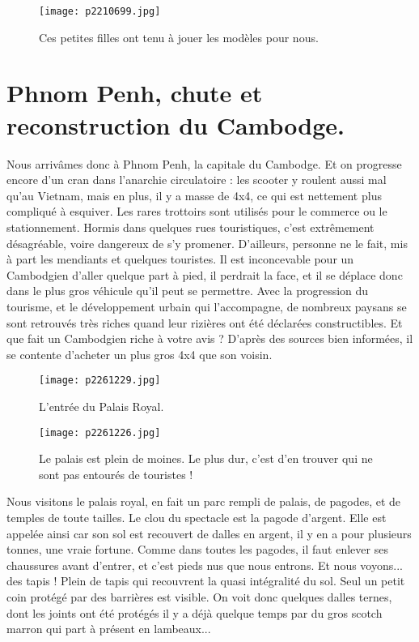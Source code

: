 \documentclass{book}
\begin{document}
\begin{figure}[h]
\centering
\texttt{[image: p2210699.jpg]}
\caption*{Ces petites filles ont tenu à jouer les modèles pour nous.}
\end{figure}



\chapter{Phnom Penh, chute et reconstruction du Cambodge.}
Nous arrivâmes donc à Phnom Penh, la capitale du Cambodge. Et on progresse encore d'un cran dans l'anarchie circulatoire : les scooter y roulent aussi mal qu'au Vietnam, mais en plus, il y a masse de 4x4, ce qui est nettement plus compliqué à esquiver. Les rares trottoirs sont utilisés pour le commerce ou le stationnement. Hormis dans quelques rues touristiques, c'est extrêmement désagréable, voire dangereux de s'y promener. D'ailleurs, personne ne le fait, mis à part les mendiants et quelques touristes. Il est inconcevable pour un Cambodgien d'aller quelque part à pied, il perdrait la face, et il se déplace donc dans le plus gros véhicule qu'il peut se permettre. Avec la progression du tourisme, et le développement urbain qui l'accompagne, de nombreux paysans se sont retrouvés très riches quand leur rizières ont été déclarées constructibles. Et que fait un Cambodgien riche à votre avis ? D'après des sources bien informées, il se contente d'acheter un plus gros 4x4 que son voisin.


\begin{figure}[h]
\centering
\texttt{[image: p2261229.jpg]}
\caption*{L'entrée du Palais Royal.}
\end{figure}




\begin{figure}[h]
\centering
\texttt{[image: p2261226.jpg]}
\caption*{Le palais est plein de moines. Le plus dur, c'est d'en trouver qui ne sont pas entourés de touristes !}
\end{figure}

Nous visitons le palais royal, en fait un parc rempli de palais, de pagodes, et de temples de toute tailles. Le clou du spectacle est la pagode d'argent. Elle est appelée ainsi car son sol est recouvert de dalles en argent, il y en a pour plusieurs tonnes, une vraie fortune. Comme dans toutes les pagodes, il faut enlever ses chaussures avant d'entrer, et c'est pieds nus que nous entrons. Et nous voyons... des tapis ! Plein de tapis qui recouvrent la quasi intégralité du sol. Seul un petit coin protégé par des barrières est visible. On voit donc quelques dalles ternes, dont les joints ont été protégés il y a déjà quelque temps par du gros scotch marron qui part à présent en lambeaux...
\end{document}
